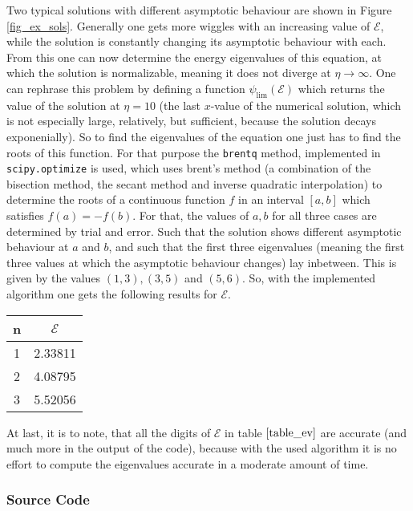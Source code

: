 \documentclass[12pt, a4paper]{article}
\newenvironment{code}{\captionsetup{type=listing}}{}
\begin{document}
  \noindent
  Two typical solutions with different asymptotic behaviour are shown in Figure \ref{fig_ex_sols}. Generally one gets more \glqq wiggles\grqq{} with an increasing value of $\mathcal{E}$, while the solution is constantly changing its asymptotic behaviour with each.\\
  From this one can now determine the energy eigenvalues of this equation, at which the solution is normalizable, meaning it does not diverge at $\eta \rightarrow \infty$. One can rephrase this problem by defining a function $\psi_{\lim}(\mathcal{E})$ which returns the value of the solution at $\eta = 10$ (the last $x$-value of the numerical solution, which is not especially large, relatively, but sufficient, because the solution decays exponenially). So to find the eigenvalues of the equation one just has to find the roots of this function. For that purpose the {\tt brentq} method, implemented in {\tt scipy.optimize} is used, which uses brent's method (a combination of the bisection method, the secant method and inverse quadratic interpolation) to determine the roots of a continuous function $f$ in an interval $[a, b]$ which satisfies $f(a) = -f(b)$. For that, the values of $a, b$ for all three cases are determined by trial and error. Such that the solution shows different asymptotic behaviour at $a$ and $b$, and such that the first three eigenvalues (meaning the first three values at which the asymptotic behaviour changes) lay inbetween. This is given by the values $(1, 3), (3, 5)$ and $(5, 6)$. So, with the implemented algorithm one gets the following results for $\mathcal{E}$.

  \begin{center}
    \begin{tabular}{c | c}
      n & $\mathcal{E}$ \\
      \hline
      1 & 2.33811 \\
      2 & 4.08795 \\
      3 & 5.52056 \\
    \end{tabular}
    \label{table_ev}
  \end{center}

  \noindent
  At last, it is to note, that all the digits of $\mathcal{E}$ in table $\ref{table_ev}$ are accurate (and much more in the output of the code), because with the used algorithm it is no effort to compute the eigenvalues accurate in a moderate amount of time.

  \subsubsection*{Source Code}

  \begin{code}
    \inputminted{python}{numerov.py}
  \end{code}
  \begin{code}
    \inputminted{python}{problem2a.py}
  \end{code}
  \begin{code}
    \inputminted{python}{problem2b.py}
  \end{code}
\end{document}
